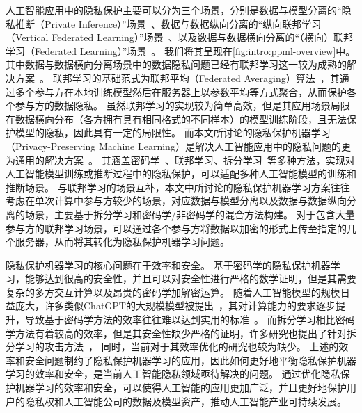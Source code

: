 人工智能应用中的隐私保护主要可以分为三个场景，分别是数据与模型分离的“隐私推断（Private Inference）”场景~\cite{mann_2023_secure_inference}、数据与数据纵向分离的“纵向联邦学习（Vertical Federated Learning）”场景~\cite{liu2024vertical}、以及数据与数据横向分离的“（横向）联邦学习（Federated Learning）”场景~\cite{yangqiang2019federated}。
%
我们将其呈现在\autoref{fig:intro:ppml-overview}中。
%
其中数据与数据横向分离场景中的数据隐私问题已经有联邦学习这一较为成熟的解决方案~\cite{yangqiang2019federated}。
联邦学习的基础范式为联邦平均（Federated Averaging）算法~\cite{mcmahan_2017_fedavg}，其通过多个参与方在本地训练模型然后在服务器上以参数平均等方式聚合，从而保护各个参与方的数据隐私。
%
虽然联邦学习的实现较为简单高效，但是其应用场景局限在数据横向分布（各方拥有具有相同格式的不同样本）的模型训练阶段，且无法保护模型的隐私，因此具有一定的局限性。
%
而本文所讨论的隐私保护机器学习（Privacy-Preserving Machine Learning）是解决人工智能应用中的隐私问题的更为通用的解决方案~\cite{al_2019_ppml,xu_2021_ppml}。
%
其涵盖密码学~\cite{evans_2018_pragmatic_mpc}、联邦学习、拆分学习~\cite{vepakomma2018split}等多种方法，实现对人工智能模型训练或推断过程中的隐私保护，可以适配多种人工智能模型的训练和推断场景。
%
与联邦学习的场景互补，本文中所讨论的隐私保护机器学习方案往往考虑在单次计算中参与方较少的场景，对应数据与模型分离以及数据与数据纵向分离的场景，主要基于拆分学习和密码学/非密码学的混合方法构建。
%
对于包含大量参与方的联邦学习场景，可以通过各个参与方将数据以加密的形式上传至指定的几个服务器，从而将其转化为隐私保护机器学习问题。

隐私保护机器学习的核心问题在于效率和安全。
%
基于密码学的隐私保护机器学习，能够达到很高的安全性，并且可以对安全性进行严格的数学证明，但是其需要复杂的多方交互计算以及昂贵的密码学加解密运算。
随着人工智能模型的规模日益庞大，许多类似ChatGPT的大规模模型被提出~\cite{chatgpt,touvron_2023_llama,duzhengxiao_2022_glm}，其对计算能力的要求逐步提升，导致基于密码学方法的效率往往难以达到实用的标准~\cite{hou2023ciphergpt}。
%
而拆分学习相比密码学方法有着较高的效率，但是其安全性缺少严格的证明，许多研究也提出了针对拆分学习的攻击方法~\cite{hezecheng_2019_model_inversion_attack,abuadbba2020can_split}，
同时，当前对于其效率优化的研究也较为缺少。
%
上述的效率和安全问题制约了隐私保护机器学习的应用，因此如何更好地平衡隐私保护机器学习的效率和安全，是当前人工智能隐私领域亟待解决的问题。
%
通过优化隐私保护机器学习的效率和安全，可以使得人工智能的应用更加广泛，并且更好地保护用户的隐私权和人工智能公司的数据及模型资产，推动人工智能产业可持续发展。



